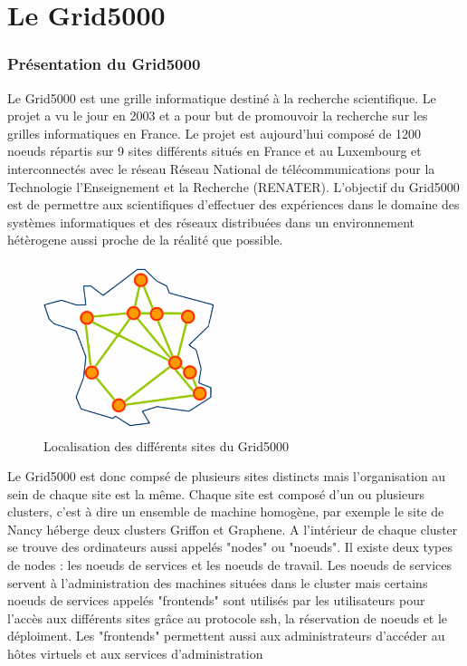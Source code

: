 \documentclass [10pt,a4paper]{report}
\begin{document}
\part{Le Grid5000}
	\section{Présentation du Grid5000}
Le Grid5000 est une grille informatique destiné à la recherche scientifique. Le projet a vu le jour en 2003 et a pour but de promouvoir la recherche sur les grilles informatiques en France. Le projet est aujourd'hui composé de 1200 noeuds répartis sur 9 sites différents situés en France et au Luxembourg et interconnectés avec le réseau Réseau National de télécommunications pour la Technologie l'Enseignement et la Recherche (RENATER). L'objectif du Grid5000 est de permettre aux scientifiques d'effectuer des expériences dans le domaine des systèmes informatiques et des réseaux distribuées dans un environnement hétèrogene aussi proche de la réalité que possible.

	\begin{figure}[!h]
		\centering
   		\includegraphics[width=5cm,height=5cm]{map.png}
   		\caption{Localisation des différents sites du Grid5000}
    	\label{fig:map}
	\end{figure} 

Le Grid5000 est donc compsé de plusieurs sites distincts mais l'organisation au sein de chaque site est la même. Chaque site est composé d'un ou plusieurs clusters, c'est à dire un ensemble de machine homogène, par exemple le site de Nancy héberge deux clusters Griffon et Graphene. A l'intérieur de chaque cluster se trouve des ordinateurs aussi appelés "nodes" ou "noeuds". Il existe deux types de nodes : les noeuds de services et les noeuds de travail. Les noeuds de services servent à l'administration des machines situées dans le cluster mais certains noeuds de services appelés "frontends" sont utilisés par les utilisateurs pour l'accès aux différents sites grâce au protocole ssh, la réservation de noeuds et le déploiment. Les "frontends" permettent aussi aux administrateurs d'accéder au hôtes virtuels et aux services d'administration
\end{document}
